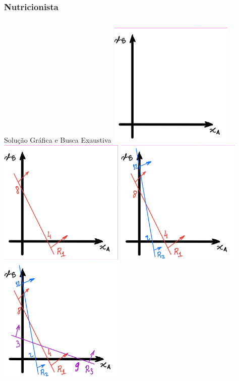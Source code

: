 \documentclass{beamer}
\begin{document}
\begin{frame}
	\frametitle{Nutricionista}
	\begin{columns}
		\begin{column}{0.6\textwidth}
			\begin{block}{Solução Gráfica e Busca Exaustiva}
				\centering
				\only<1>
				{
					\includegraphics[width=6cm,height=6cm]{Nutri_1.png}
				}
				\only<2>
				{
					\includegraphics[width=6cm,height=6cm]{Nutri_2.png}
				}
				\only<3>
				{
					\includegraphics[width=6cm,height=6cm]{Nutri_3.png}
				}
				\only<4>
				{
					\includegraphics[width=6cm,height=6cm]{Nutri_4.png}
}
\end{block}
\end{column}
\end{columns}
\end{frame}
\end{document}
